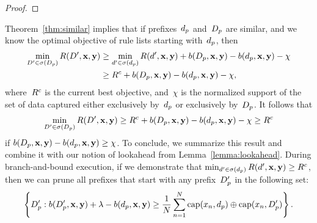 \begin{arxiv}
\begin{proof}
\end{proof}

Theorem~\ref{thm:similar} implies that if prefixes~$d_p$
and~$D_p$ are similar, and we know the optimal objective
of rule lists starting with~$d_p$, then
\begin{align}
\min_{{D}' \in \sigma(D_p)} R({D}', \mathbf{x}, \mathbf{y})
&\ge \min_{{d}' \in \sigma(d_p)} R({d}', \mathbf{x}, \mathbf{y})
+ b(D_p, \mathbf{x}, \mathbf{y}) - b(d_p, \mathbf{x}, \mathbf{y}) - \chi \nonumber \\
&\ge {R^c} + b(D_p, \mathbf{x}, \mathbf{y}) - b(d_p, \mathbf{x}, \mathbf{y}) - \chi,
\end{align}
where~${R^c}$ is the current best objective,
and~$\chi$ is the normalized support of the set of data captured
either exclusively by~$d_p$ or exclusively by~$D_p$.
%
It follows that
\begin{align}
\min_{{D}' \in \sigma(D_p)} R({D}', \mathbf{x}, \mathbf{y})
\ge {R^c} + b(D_p, \mathbf{x}, \mathbf{y}) - b(d_p, \mathbf{x}, \mathbf{y}) - \chi \ge {R^c}
\end{align}
if ${b(D_p, \mathbf{x}, \mathbf{y}) - b(d_p, \mathbf{x}, \mathbf{y}) \ge \chi}$.
%
To conclude, we summarize this result and combine it with
our notion of lookahead from Lemma~\ref{lemma:lookahead}.
%
During branch-and-bound execution, if we demonstrate that
${\min_{{d}' \in \sigma(d_p)} R({d}', \mathbf{x}, \mathbf{y}) \ge {R^c}}$,
then we can prune all prefixes that start with any
prefix~$D_p'$ in the following set:
\begin{align}
\left\{ D_p' : b(D_p', \mathbf{x}, \mathbf{y}) + {\lambda} - b(d_p, \mathbf{x}, \mathbf{y}) \ge
\frac{1}{N} \sum_{n=1}^N \textnormal{cap}(x_n, d_p) \oplus \textnormal{cap}(x_n, D_p') \right\}.
\end{align}

\begin{comment}
To demonstrate~\eqref{eq:similar-analogous-optimal},
we consider two separate scenarios.
%
In the first scenario, prefixes~$\Prefix$ and~$\PrefixB$
capture the same data, therefore ${\omega = \Omega = 0}$.
%
By claim~\eqref{eq:equiv-analogous-optimal},
which we justify in the proof of Theorem~\ref{thm:equivalent},
${\RLB^* \in \argmin_{\RLB^\dagger \in \StartsWith(\PrefixB)} \Obj(\RLB^\dagger, \x, \y)}$,
thus
\begin{align}
\Obj(\RLB^*, \x, \y)
  = \min_{\RLB^\dagger \in \StartsWith(\PrefixB)} \Obj(\RLB^\dagger, \x, \y)
\le \min_{\RLB^\dagger \in \StartsWith(\PrefixB)}
  \Obj(\RLB^\dagger, \x, \y) + \omega + \Omega.
\end{align}


\end{comment}
\end{arxiv}
